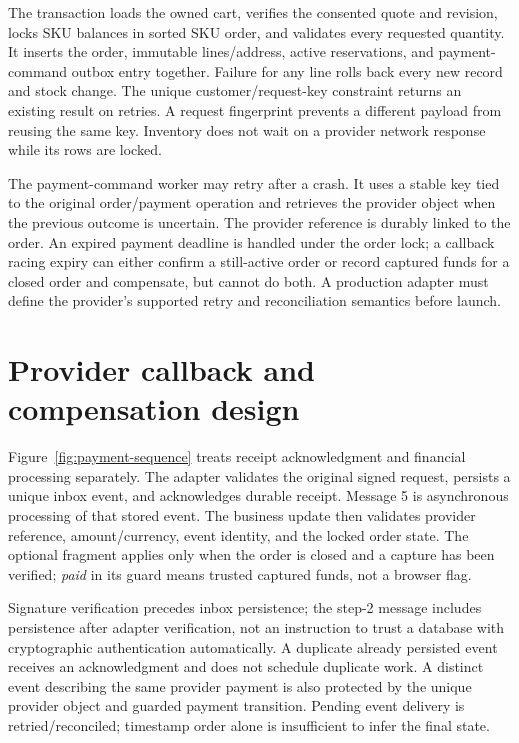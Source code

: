 The transaction loads the owned cart, verifies the consented quote and revision, locks SKU balances in sorted SKU order, and validates every requested quantity. It inserts the order, immutable lines/address, active reservations, and payment-command outbox entry together. Failure for any line rolls back every new record and stock change. The unique customer/request-key constraint returns an existing result on retries. A request fingerprint prevents a different payload from reusing the same key. Inventory does not wait on a provider network response while its rows are locked.

The payment-command worker may retry after a crash. It uses a stable key tied to the original order/payment operation and retrieves the provider object when the previous outcome is uncertain. The provider reference is durably linked to the order. An expired payment deadline is handled under the order lock; a callback racing expiry can either confirm a still-active order or record captured funds for a closed order and compensate, but cannot do both. A production adapter must define the provider's supported retry and reconciliation semantics before launch.

\section{Provider callback and compensation design}
Figure~\ref{fig:payment-sequence} treats receipt acknowledgment and financial processing separately. The adapter validates the original signed request, persists a unique inbox event, and acknowledges durable receipt. Message 5 is asynchronous processing of that stored event. The business update then validates provider reference, amount/currency, event identity, and the locked order state. The optional fragment applies only when the order is closed and a capture has been verified; \emph{paid} in its guard means trusted captured funds, not a browser flag.

Signature verification precedes inbox persistence; the step-2 message includes persistence after adapter verification, not an instruction to trust a database with cryptographic authentication automatically. A duplicate already persisted event receives an acknowledgment and does not schedule duplicate work. A distinct event describing the same provider payment is also protected by the unique provider object and guarded payment transition. Pending event delivery is retried/reconciled; timestamp order alone is insufficient to infer the final state\cite{stripewebhook}.


